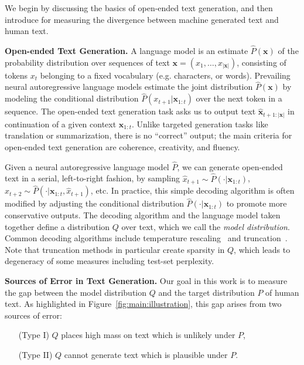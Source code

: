 \documentclass{article}
\newcommand{\myparagraph}[1]{\par\noindent\textbf{{#1}.}} %
\newcommand \xv {\bm{x}}
\theoremstyle{definition}
\newcommand{\name}{{\fontfamily{bch}\selectfont{\textsc{Mauve}}}\xspace}
\begin{document}
We begin by discussing the basics of open-ended text generation, and then introduce \name for measuring the divergence between machine generated text and human text.
%
\myparagraph{Open-ended Text Generation}
A language model is an estimate $\hat P(\xv)$ of the probability distribution over sequences of text $\xv=(x_1,\ldots,x_{|\xv|})$, consisting of tokens $x_t$ belonging to a fixed vocabulary (e.g. characters, or words).
Prevailing neural autoregressive language models estimate the joint distribution $\hat P(\xv)$ by modeling the conditional distribution $\hat P(x_{t+1}|\xv_{1:t})$ over the next token in a sequence.
The open-ended text generation task asks us to output text $\hat{\xv}_{t+1:|\xv|}$ in continuation of a given context $\xv_{1:t}$.
Unlike targeted generation tasks like translation or summarization, there is no ``correct'' output; the main criteria for open-ended text generation are coherence, creativity, and fluency.

Given a neural autoregressive language model $\hat P$, we can generate open-ended text in a serial, left-to-right fashion, by sampling $\hat{x}_{t+1} \sim \hat P(\cdot|\xv_{1:t})$, $\hat{x}_{t+2} \sim \hat P(\cdot|\xv_{1:t}, \hat{x}_{t+1})$, etc. In practice, this simple decoding algorithm is often modified by adjusting the conditional distribution $\hat P(\cdot|\xv_{1:t})$ to promote more conservative outputs.
The decoding algorithm and the language model taken together define a distribution $Q$ over text, which we call the \textit{model distribution}.
Common decoding algorithms include temperature rescaling~\cite{ackley1985learning}
and truncation~\cite{fan2018heirarchical,holtzman2019curious}. Note that truncation methods in particular create sparsity in $Q$, which leads to degeneracy of some measures including test-set perplexity.

\myparagraph{Sources of Error in Text Generation} 
Our goal in this work is to measure the gap between the model distribution $Q$ and the target distribution $P$ of human text. 
As highlighted in Figure~\ref{fig:main:illustration},
this gap arises from two sources of error: 
%
\begin{itemize}[itemsep=0cm,leftmargin=1.7cm,topsep=0cm]
\item[(Type I)] $Q$ places high mass on text which is unlikely under $P$, 
\item[(Type II)] $Q$ cannot generate text which is plausible under $P$.
\end{itemize}
\end{document}
